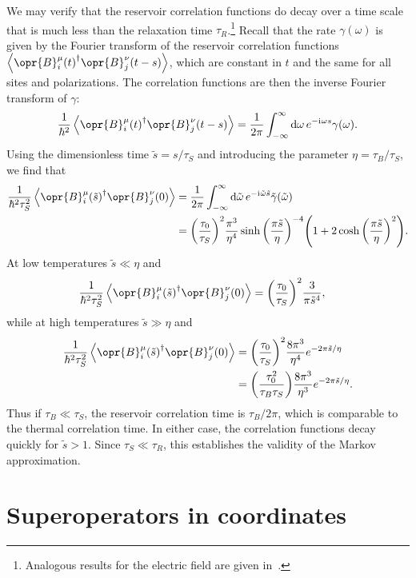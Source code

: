 \documentclass[../thesis.tex]{subfiles}
\begin{document}
We may verify that the reservoir correlation functions do decay over a time
scale that is much less than the relaxation time $\tau_R$.\footnote{%
  Analogous results for the electric field are given in~\cite[p.~574]{opensys}.
}
Recall that the rate $\gamma(\omega)$ is given by the Fourier transform of the
reservoir correlation functions
$\ev{\opr{B}_i^\mu{(t)}^\dag\opr{B}_j^\nu(t-s)}$, which are constant in $t$ and
the same for all sites and polarizations. The correlation functions are then the
inverse Fourier transform of $\gamma$:
\begin{equation}
  \frac{1}{\hbar^2}\ev{\opr{B}_i^\mu{(t)}^\dag\opr{B}_j^\nu(t-s)}
  = \frac{1}{2\pi}\int_{-\infty}^\infty \dd{\omega} e^{-\im\omega s}
  \gamma(\omega).
\end{equation}
Using the dimensionless time $\tilde{s} = s / \tau_S$ and introducing the
parameter $\eta = \tau_B / \tau_S$, we find that
\begin{align}
  \frac{1}{\hbar^2 \tau_S^2}\ev{\opr{B}_i^\mu{(\tilde{s})}^\dag\opr{B}_j^\nu(0)}
  &= \frac{1}{2\pi}\int_{-\infty}^\infty \dd{\tilde{\omega}}
  e^{-\im\tilde{\omega} \tilde{s}}
  \tilde{\gamma}(\tilde{\omega}) \\
  &= {\qty(\frac{\tau_0}{\tau_S})}^2 \frac{\pi^3}{\eta^4}
  \sinh{\qty(\frac{\pi \tilde{s}}{\eta})}^{-4} \qty(%
  1 + 2\cosh{\qty(\frac{\pi\tilde{s}}{\eta})}^2
  ).
\end{align}
At low temperatures $\tilde{s} \ll \eta$ and
\begin{align}
  \frac{1}{\hbar^2 \tau_S^2}\ev{\opr{B}_i^\mu{(\tilde{s})}^\dag\opr{B}_j^\nu(0)}
  &= {\qty(\frac{\tau_0}{\tau_S})}^2 \frac{3}{\pi \tilde{s}^4},
\end{align}
while at high temperatures $\tilde{s} \gg \eta$ and
\begin{align}
  \frac{1}{\hbar^2 \tau_S^2}\ev{\opr{B}_i^\mu{(\tilde{s})}^\dag\opr{B}_j^\nu(0)}
  &= {\qty(\frac{\tau_0}{\tau_S})}^2 \frac{8\pi^3}{\eta^4}
  e^{-2\pi\tilde{s} / \eta} \\
  &= \qty(\frac{\tau_0^2}{\tau_B \tau_S}) \frac{8\pi^3}{\eta^3}
  e^{-2\pi\tilde{s} / \eta}.
\end{align}
Thus if $\tau_B \ll \tau_S$, the reservoir correlation time is $\tau_B / 2\pi$,
which is comparable to the thermal correlation time. In either case, the
correlation functions decay quickly for $\tilde{s} > 1$. Since $\tau_S \ll
\tau_R$, this establishes the validity of the Markov approximation.


\section{Superoperators in coordinates}
\end{document}
